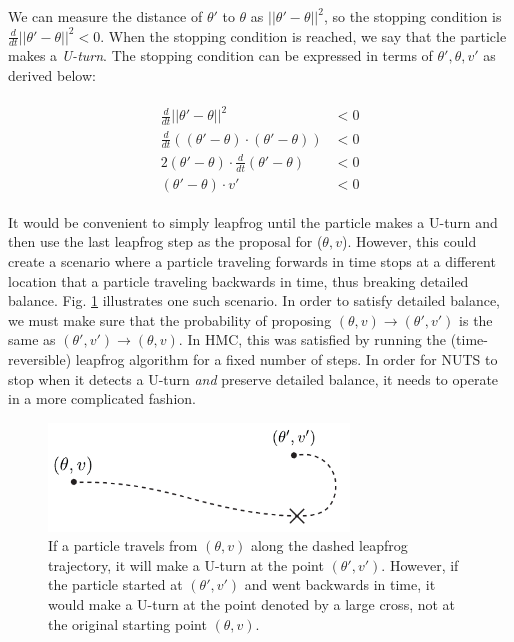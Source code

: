 \documentclass[12pt]{article}
\begin{document}
{We can measure the distance of $\theta'$ to $\theta$ as $||\theta'-\theta||^2$, so the stopping condition is $\frac{d}{dt} ||\theta'-\theta||^2 < 0$. When the stopping condition is reached, we say that the particle makes a \textit{U-turn}. The stopping condition can be expressed in terms of $\theta', \theta, v'$ as derived below:

\begin{align}
\begin{split}
\frac{d}{dt} ||\theta'-\theta||^2 &< 0 \\
\frac{d}{dt} \left((\theta'-\theta) \cdot (\theta'-\theta) \right) &< 0 \\
2(\theta'-\theta) \cdot \frac{d}{dt}(\theta'-\theta) &< 0 \\
(\theta'-\theta) \cdot v' &< 0
\end{split}
\label{eq_uturn}
\end{align}

It would be convenient to simply leapfrog until the particle makes a U-turn and then use the last leapfrog step as the proposal for ($\theta, v$). However, this could create a scenario where a particle traveling forwards in time stops at a different location that a particle traveling backwards in time, thus breaking detailed balance. Fig. \ref{fig_nuts_uturn_detailed_balance} illustrates one such scenario. In order to satisfy detailed balance, we must make sure that the probability of proposing $(\theta, v) \rightarrow (\theta', v')$ is the same as $(\theta', v') \rightarrow (\theta, v)$. In HMC, this was satisfied by running the (time-reversible) leapfrog algorithm for a fixed number of steps. In order for NUTS to stop when it detects a U-turn \textit{and} preserve detailed balance, it needs to operate in a more complicated fashion.

\begin{figure}[H]
\centering
\includegraphics[width=8cm]{illustrations/nuts_uturn_detailed_balance.pdf}
\caption{If a particle travels from $(\theta, v)$ along the dashed leapfrog trajectory, it will make a U-turn at the point $(\theta', v')$. However, if the particle started at $(\theta', v')$ and went backwards in time, it would make a U-turn at the point denoted by a large cross, not at the original starting point $(\theta, v)$.}
\label{fig_nuts_uturn_detailed_balance}
\end{figure}

}
\end{document}
